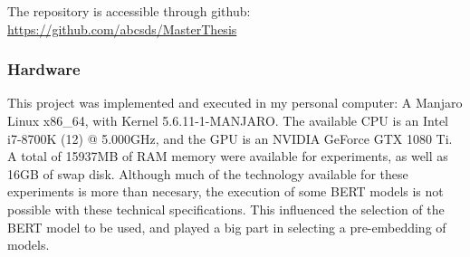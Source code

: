 The repository is accessible through github: \url{https://github.com/abcsds/MasterThesis}

\subsubsection{Hardware}\label{subs:Hardware}
This project was implemented and executed in my personal computer: A Manjaro Linux x86_64, with Kernel 5.6.11-1-MANJARO. The available CPU is an Intel i7-8700K (12) @ 5.000GHz, and the GPU is an NVIDIA GeForce GTX 1080 Ti. A total of 15937MB of RAM memory were available for experiments, as well as 16GB of swap disk. Although much of the technology available for these experiments is more than necesary, the execution of some BERT models is not possible with these technical specifications. This influenced the selection of the BERT model to be used, and played a big part in selecting a pre-embedding of models.

